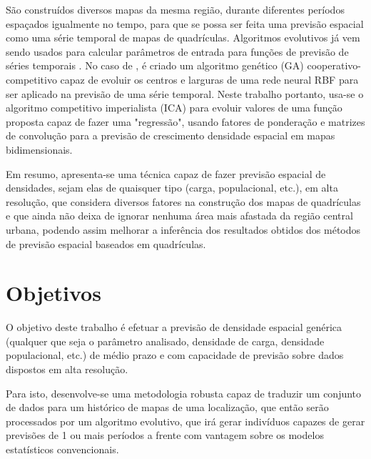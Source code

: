 São construídos diversos mapas da mesma região, durante diferentes períodos espaçados igualmente no tempo, para que se possa ser feita uma previsão espacial como uma série temporal de mapas de quadrículas. Algoritmos evolutivos já vem sendo usados para calcular parâmetros de entrada para funções de previsão de séries temporais \cite{whitehead1996cooperative}. No caso de \citeauthor{whitehead1996cooperative}, é criado um algoritmo genético (GA) \cite{mitchell1998introduction} cooperativo-competitivo capaz de evoluir os centros e larguras de uma rede neural RBF \cite{ren2006rbfnn} para ser aplicado na previsão de uma série temporal. Neste trabalho portanto, usa-se o algoritmo competitivo imperialista (ICA) para evoluir valores de uma função proposta capaz de fazer uma "regressão", usando fatores de ponderação e matrizes de convolução para a previsão de crescimento densidade espacial em mapas bidimensionais.

Em resumo, apresenta-se uma técnica capaz de fazer previsão espacial de densidades, sejam elas de quaisquer tipo (carga, populacional, etc.), em alta resolução, que considera diversos fatores na construção dos mapas de quadrículas e que ainda não deixa de ignorar nenhuma área mais afastada da região central urbana, podendo assim melhorar a inferência dos resultados obtidos dos métodos de previsão espacial baseados em quadrículas. 

\section{Objetivos}

O objetivo deste trabalho é efetuar a previsão de densidade espacial genérica (qualquer que seja o parâmetro analisado, densidade de carga, densidade populacional, etc.) de médio prazo e com capacidade de previsão sobre dados dispostos em alta resolução.

Para isto, desenvolve-se uma metodologia robusta capaz de traduzir um conjunto de dados para um histórico de mapas de uma localização, que então serão processados por um algoritmo evolutivo, que irá gerar indivíduos capazes de gerar previsões de 1 ou mais períodos a frente com vantagem sobre os modelos estatísticos convencionais. 

